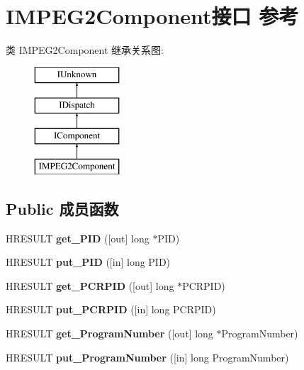 \hypertarget{interface_i_m_p_e_g2_component}{}\section{I\+M\+P\+E\+G2\+Component接口 参考}
\label{interface_i_m_p_e_g2_component}
类 I\+M\+P\+E\+G2\+Component 继承关系图\+:\begin{figure}[H]
\begin{center}
\leavevmode
\includegraphics[height=4.000000cm]{interface_i_m_p_e_g2_component}
\end{center}
\end{figure}
\subsection*{Public 成员函数}
\begin{DoxyCompactItemize}
\item 
\mbox{\label{interface_i_m_p_e_g2_component_a67ccacccae7442e53a24f43d667a0cc7}} 
H\+R\+E\+S\+U\+LT {\bfseries get\+\_\+\+P\+ID} (\mbox{[}out\mbox{]} long $\ast$P\+ID)
\item 
\mbox{\label{interface_i_m_p_e_g2_component_a09fd8eab38dea13e5f22eb1dd18d34a2}} 
H\+R\+E\+S\+U\+LT {\bfseries put\+\_\+\+P\+ID} (\mbox{[}in\mbox{]} long P\+ID)
\item 
\mbox{\label{interface_i_m_p_e_g2_component_ad7e2d06ae1d4c8c83c3159d2a7d42448}} 
H\+R\+E\+S\+U\+LT {\bfseries get\+\_\+\+P\+C\+R\+P\+ID} (\mbox{[}out\mbox{]} long $\ast$P\+C\+R\+P\+ID)
\item 
\mbox{\label{interface_i_m_p_e_g2_component_a11d2c8dcd98a26863eed0a5ca3e6e070}} 
H\+R\+E\+S\+U\+LT {\bfseries put\+\_\+\+P\+C\+R\+P\+ID} (\mbox{[}in\mbox{]} long P\+C\+R\+P\+ID)
\item 
\mbox{\label{interface_i_m_p_e_g2_component_a0394e575e0b755478834b7b3d3f3ce3b}} 
H\+R\+E\+S\+U\+LT {\bfseries get\+\_\+\+Program\+Number} (\mbox{[}out\mbox{]} long $\ast$Program\+Number)
\item 
\mbox{\label{interface_i_m_p_e_g2_component_a4206869e5be544441e6b508971230993}} 
H\+R\+E\+S\+U\+LT {\bfseries put\+\_\+\+Program\+Number} (\mbox{[}in\mbox{]} long Program\+Number)
\end{DoxyCompactItemize}
